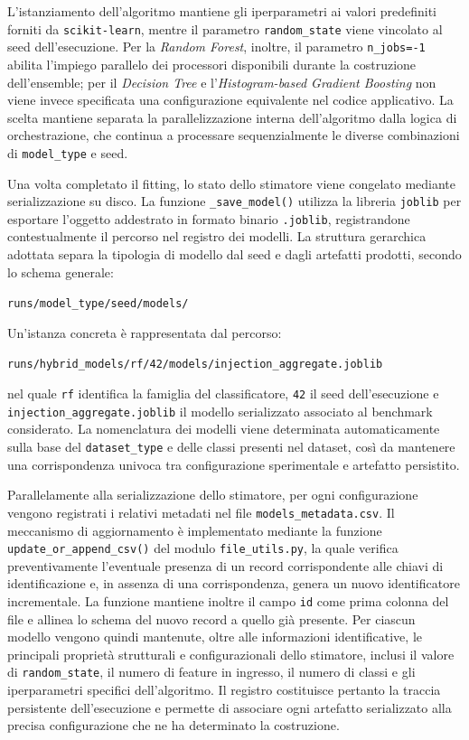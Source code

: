L'istanziamento dell'algoritmo mantiene gli iperparametri ai valori predefiniti forniti da \newline \texttt{scikit-learn}, mentre il parametro \texttt{random\_state} viene vincolato al seed dell'esecuzione. 
Per la \textit{Random Forest}, inoltre, il parametro \texttt{n\_jobs=-1} abilita l'impiego parallelo dei processori disponibili durante la costruzione dell'ensemble; per il \textit{Decision Tree} e l'\textit{Histogram-based Gradient Boosting} non viene invece specificata una configurazione equivalente nel codice applicativo. 
La scelta mantiene separata la parallelizzazione interna dell'algoritmo dalla logica di orchestrazione, che continua a processare sequenzialmente le diverse combinazioni di \texttt{model\_type} e seed.

Una volta completato il fitting, lo stato dello stimatore viene congelato mediante serializzazione su disco. 
La funzione \texttt{\_save\_model()} utilizza la libreria \texttt{joblib} per esportare l'oggetto addestrato in formato binario \texttt{.joblib}, registrandone contestualmente il percorso nel registro dei modelli. 
La struttura gerarchica adottata separa la tipologia di modello dal seed e dagli artefatti prodotti, secondo lo schema generale:
\begin{center}
    \texttt{runs/model\_type/seed/models/}
\end{center}
Un'istanza concreta è rappresentata dal percorso:
\begin{center}
    \texttt{runs/hybrid\_models/rf/42/models/injection\_aggregate.joblib}
\end{center}
nel quale \texttt{rf} identifica la famiglia del classificatore, \texttt{42} il seed dell'esecuzione e \newline \texttt{injection\_aggregate.joblib} il modello serializzato associato al benchmark considerato. 
La nomenclatura dei modelli viene determinata automaticamente sulla base del \texttt{dataset\_type} e delle classi presenti nel dataset, così da mantenere una corrispondenza univoca tra configurazione sperimentale e artefatto persistito.

Parallelamente alla serializzazione dello stimatore, per ogni configurazione vengono registrati i relativi metadati nel file \texttt{models\_metadata.csv}. 
Il meccanismo di aggiornamento è implementato mediante la funzione \texttt{update\_or\_append\_csv()} del modulo \texttt{file\_utils.py}, la quale verifica preventivamente l'eventuale presenza di un record corrispondente alle chiavi di identificazione e, in assenza di una corrispondenza, genera un nuovo identificatore incrementale. 
La funzione mantiene inoltre il campo \texttt{id} come prima colonna del file e allinea lo schema del nuovo record a quello già presente. 
Per ciascun modello vengono quindi mantenute, oltre alle informazioni identificative, le principali proprietà strutturali e configurazionali dello stimatore, inclusi il valore di \texttt{random\_state}, il numero di feature in ingresso, il numero di classi e gli iperparametri specifici dell'algoritmo. 
Il registro costituisce pertanto la traccia persistente dell'esecuzione e permette di associare ogni artefatto serializzato alla precisa configurazione che ne ha determinato la costruzione.

